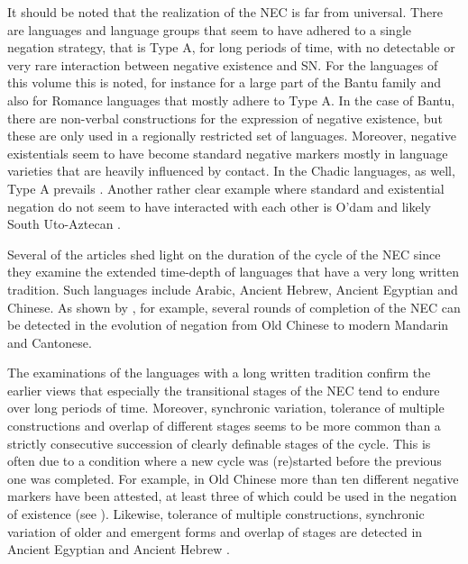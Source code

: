 \documentclass[output=paper,chinesefont,colorlinks,citecolor=brown]{langscibook}
\begin{document}
It should be noted that the realization of the NEC is far from universal. There are languages and language groups that seem to have adhered to a single negation strategy, that is Type A, for long periods of time, with no detectable or very rare interaction between negative existence and SN. For the languages of this volume this is noted, for instance for a large part of the Bantu family and also for Romance languages  that mostly adhere to Type A. In the case of Bantu, there are non-verbal constructions for the expression of negative existence, but these are only used in a regionally restricted set of languages. Moreover, negative existentials seem to have become standard negative markers mostly in language varieties that are heavily influenced by contact. In the Chadic languages, as well, Type A prevails . Another rather clear example where standard and existential negation do not seem to have interacted with each other is O’dam and likely South Uto-Aztecan .

Several of the articles  shed light on the duration of the cycle of the NEC since they examine the extended time-depth of languages that have a very long written tradition. Such languages include Arabic, Ancient Hebrew, Ancient Egyptian and Chinese. As shown by , for example, several rounds of completion of the NEC can be detected in the evolution of negation from Old Chinese to modern Mandarin and Cantonese.

The examinations of the languages with a long written tradition confirm the earlier views that especially the transitional stages of the NEC tend to endure over long periods of time. Moreover, synchronic variation, tolerance of multiple constructions and overlap of different stages seems to be more common than a strictly consecutive succession of clearly definable stages of the cycle. This is often due to a condition where a new cycle was (re)started before the previous one was completed. For example, in Old Chinese more than ten different negative markers have been attested, at least three of which could be used in the negation of existence (see ). Likewise, tolerance of multiple constructions, synchronic variation of older and emergent forms and overlap of stages are detected in Ancient Egyptian  and Ancient Hebrew .
\end{document}
